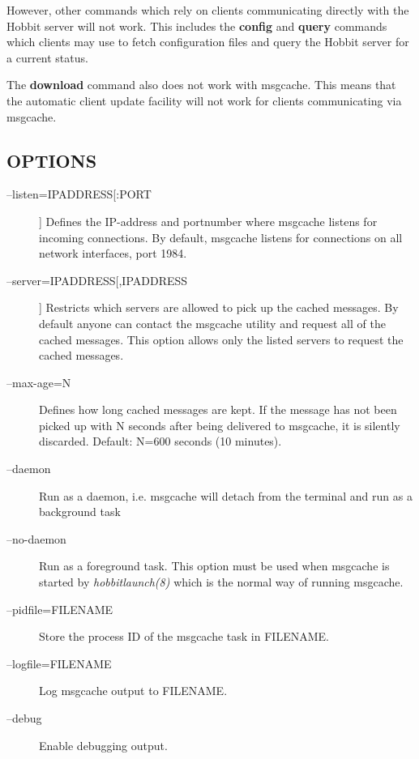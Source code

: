   However, other commands which rely on clients communicating directly with the Hobbit server will not work. This includes the \textbf{config}
 and \textbf{query}
 commands which clients may use to fetch configuration files and query the Hobbit server for a current status. 


  The \textbf{download}
 command also does not work with msgcache. This means that the automatic client update facility will not work for clients communicating via msgcache. 


 
\subsection{OPTIONS}
\begin{description}
\item[--listen=IPADDRESS[:PORT]] Defines the IP-address and portnumber where msgcache listens for incoming connections. By default, msgcache listens for connections on all network interfaces, port 1984. 

 

\item[--server=IPADDRESS[,IPADDRESS]] Restricts which servers are allowed to pick up the cached messages. By default anyone can contact the msgcache utility and request all of the cached messages. This option allows only the listed servers to request the cached messages. 

 

\item[--max-age=N] Defines how long cached messages are kept. If the message has not been picked up with N seconds after being delivered to msgcache, it is silently discarded. Default: N=600 seconds (10 minutes). 

 

\item[--daemon] Run as a daemon, i.e. msgcache will detach from the terminal and run as a background task 

 

\item[--no-daemon] Run as a foreground task. This option must be used when msgcache is started by \emph{hobbitlaunch(8)}
 which is the normal way of running msgcache. 

 

\item[--pidfile=FILENAME] Store the process ID of the msgcache task in FILENAME. 

 

\item[--logfile=FILENAME] Log msgcache output to FILENAME. 

 

\item[--debug] Enable debugging output. 

 


\end{description}
